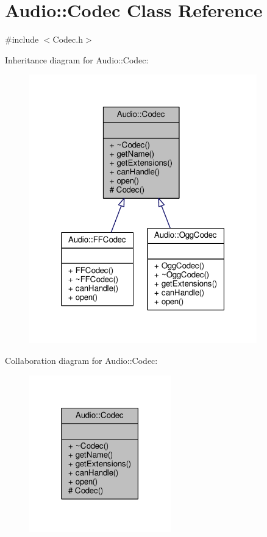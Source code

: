 \hypertarget{classAudio_1_1Codec}{}\section{Audio\+:\+:Codec Class Reference}
\label{classAudio_1_1Codec}


{\ttfamily \#include $<$Codec.\+h$>$}



Inheritance diagram for Audio\+:\+:Codec\+:
\nopagebreak
\begin{figure}[H]
\begin{center}
\leavevmode
\includegraphics[width=280pt]{d5/dd7/classAudio_1_1Codec__inherit__graph}
\end{center}
\end{figure}


Collaboration diagram for Audio\+:\+:Codec\+:
\nopagebreak
\begin{figure}[H]
\begin{center}
\leavevmode
\includegraphics[width=174pt]{db/d4c/classAudio_1_1Codec__coll__graph}
\end{center}
\end{figure}

